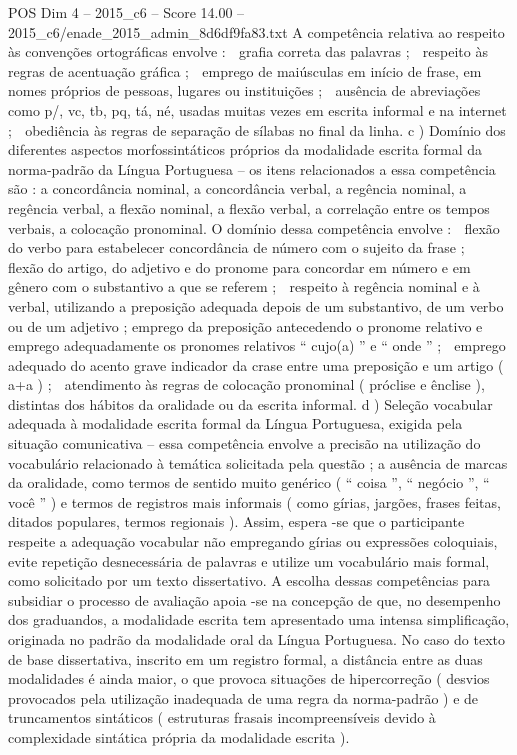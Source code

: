 \begin{textsample}{POS Dim 4 – 2015\_c6 – Score 14.00 – 2015\_c6/enade\_2015\_admin\_8d6df9fa83.txt}
A competência relativa ao respeito às convenções ortográficas envolve :  grafia correta das palavras ;  respeito às regras de acentuação gráfica ;  emprego de maiúsculas em início de frase, em nomes próprios de pessoas, lugares ou instituições ;  ausência de abreviações como p/, vc, tb, pq, tá, né, usadas muitas vezes em escrita informal e na internet ;  obediência às regras de separação de sílabas no final da linha. c ) Domínio dos diferentes aspectos morfossintáticos próprios da modalidade escrita formal da norma-padrão da Língua Portuguesa – os itens relacionados a essa competência são : a concordância nominal, a concordância verbal, a regência nominal, a regência verbal, a flexão nominal, a flexão verbal, a correlação entre os tempos verbais, a colocação pronominal.
O domínio dessa competência envolve :  flexão do verbo para estabelecer concordância de número com o sujeito da frase ;  flexão do artigo, do adjetivo e do pronome para concordar em número e em gênero com o substantivo a que se referem ;  respeito à regência nominal e à verbal, utilizando a preposição adequada depois de um substantivo, de um verbo ou de um adjetivo ; emprego da preposição antecedendo o pronome relativo e emprego adequadamente os pronomes relativos “ cujo(a) ” e “ onde ” ;  emprego adequado do acento grave indicador da crase entre uma preposição e um artigo ( a+a ) ;  atendimento às regras de colocação pronominal ( próclise e ênclise ), distintas dos hábitos da oralidade ou da escrita informal. d ) Seleção vocabular adequada à modalidade escrita formal da Língua Portuguesa, exigida pela situação comunicativa – essa competência envolve a precisão na utilização do vocabulário relacionado à temática solicitada pela questão ; a ausência de marcas da oralidade, como termos de sentido muito genérico ( “ coisa ”, “ negócio ”, “ você ” ) e termos de registros mais informais ( como gírias, jargões, frases feitas, ditados populares, termos regionais ).
Assim, espera -se que o participante respeite a adequação vocabular não empregando gírias ou expressões coloquiais, evite repetição desnecessária de palavras e utilize um vocabulário mais formal, como solicitado por um texto dissertativo.
A escolha dessas competências para subsidiar o processo de avaliação apoia -se na concepção de que, no desempenho dos graduandos, a modalidade escrita tem apresentado uma intensa simplificação, originada no padrão da modalidade oral da Língua Portuguesa.
No caso do texto de base dissertativa, inscrito em um registro formal, a distância entre as duas modalidades é ainda maior, o que provoca situações de hipercorreção ( desvios provocados pela utilização inadequada de uma regra da norma-padrão ) e de truncamentos sintáticos ( estruturas frasais incompreensíveis devido à complexidade sintática própria da modalidade escrita ).

\end{textsample}
